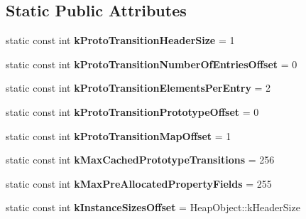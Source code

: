 \subsection*{Static Public Attributes}
\begin{DoxyCompactItemize}
\item 
\hypertarget{classv8_1_1internal_1_1_map_af0534f51136bd75b923e123dc32e3b74}{}static const int {\bfseries k\+Proto\+Transition\+Header\+Size} = 1\label{classv8_1_1internal_1_1_map_af0534f51136bd75b923e123dc32e3b74}

\item 
\hypertarget{classv8_1_1internal_1_1_map_a986f745e077847257de3460e07e4796a}{}static const int {\bfseries k\+Proto\+Transition\+Number\+Of\+Entries\+Offset} = 0\label{classv8_1_1internal_1_1_map_a986f745e077847257de3460e07e4796a}

\item 
\hypertarget{classv8_1_1internal_1_1_map_aa2ae67474548807a9c6121cb3cbd8660}{}static const int {\bfseries k\+Proto\+Transition\+Elements\+Per\+Entry} = 2\label{classv8_1_1internal_1_1_map_aa2ae67474548807a9c6121cb3cbd8660}

\item 
\hypertarget{classv8_1_1internal_1_1_map_aad1f95a33c3c4d57e3cb5511250cc471}{}static const int {\bfseries k\+Proto\+Transition\+Prototype\+Offset} = 0\label{classv8_1_1internal_1_1_map_aad1f95a33c3c4d57e3cb5511250cc471}

\item 
\hypertarget{classv8_1_1internal_1_1_map_a2764c9c1fff3dcc27cb4465f2766c3b5}{}static const int {\bfseries k\+Proto\+Transition\+Map\+Offset} = 1\label{classv8_1_1internal_1_1_map_a2764c9c1fff3dcc27cb4465f2766c3b5}

\item 
\hypertarget{classv8_1_1internal_1_1_map_a718339ce7718d9c27d4c298b49743599}{}static const int {\bfseries k\+Max\+Cached\+Prototype\+Transitions} = 256\label{classv8_1_1internal_1_1_map_a718339ce7718d9c27d4c298b49743599}

\item 
\hypertarget{classv8_1_1internal_1_1_map_ad878be44f72b34291a3995a9a9c4783d}{}static const int {\bfseries k\+Max\+Pre\+Allocated\+Property\+Fields} = 255\label{classv8_1_1internal_1_1_map_ad878be44f72b34291a3995a9a9c4783d}

\item 
\hypertarget{classv8_1_1internal_1_1_map_a87c3c5f503d77b60652e9df6a047d21c}{}static const int {\bfseries k\+Instance\+Sizes\+Offset} = Heap\+Object\+::k\+Header\+Size\label{classv8_1_1internal_1_1_map_a87c3c5f503d77b60652e9df6a047d21c}


\end{DoxyCompactItemize}
